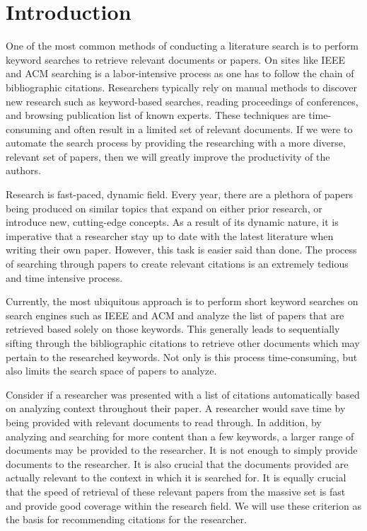 \documentclass[journal]{IEEEtran}
\begin{document}
\section{Introduction}
One of the most common methods of conducting a literature search is to perform keyword searches to retrieve relevant documents or papers. On sites like IEEE and ACM searching is a labor-intensive process as one has to follow the chain of bibliographic citations. Researchers typically rely on manual methods to discover new research such as keyword-based searches, reading proceedings of conferences, and browsing publication list of known experts. These techniques are time-consuming and often result in a limited set of relevant documents. If we were to automate the search process by providing the researching with a more diverse, relevant set of papers, then we will greatly improve the productivity of the authors.

Research is fast-paced, dynamic field.  Every year, there are a plethora of papers being produced on similar topics that expand on either prior research, or introduce new, cutting-edge concepts.  As a result of its dynamic nature, it is imperative that a researcher stay up to date with the latest literature when writing their own paper.  However, this task is easier said than done.  The process of searching through papers to create relevant citations is an extremely tedious and time intensive process.  

Currently, the most ubiquitous approach is to perform short keyword searches on search engines such as IEEE and ACM and analyze the list of papers that are retrieved based solely on those keywords.  This generally leads to sequentially sifting through the bibliographic citations to retrieve other documents which may pertain to the researched keywords.  Not only is this process time-consuming, but also limits the search space of papers to analyze.  

Consider if a researcher was presented with a list of citations automatically based on analyzing context throughout their paper.  A researcher would save time by being provided with relevant documents to read through.  In addition, by analyzing and searching for more content than a few keywords, a larger range of documents may be provided to the researcher. It is not enough to simply provide documents to the researcher.  It is also crucial that the documents provided are actually relevant to the context in which it is searched for.  It is equally crucial that the speed of retrieval of these relevant papers from the massive set is fast and provide good coverage within the research field.  We will use these criterion as the basis for recommending citations for the researcher.    
\end{document}
